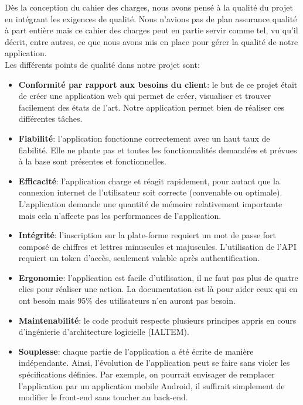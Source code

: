 \documentclass[t, 12pt, usenames,dvipsnames]{article}
\begin{document}
        \noindent Dès la conception du cahier des charges, nous avons pensé à la qualité du projet en intégrant les exigences de qualité. Nous n'avions pas de plan assurance qualité à part entière mais ce cahier des charges peut en partie servir comme tel, vu qu'il décrit, entre autres, ce que nous avons mis en place pour gérer la qualité de notre application.\\
        Les différents points de qualité dans notre projet sont:
        \begin{itemize}
            \item \textbf{Conformité par rapport aux besoins du client}: le but de ce projet était de créer une application web qui permet de créer, visualiser et trouver facilement des états de l'art. Notre application permet bien de réaliser ces différentes tâches.
            
            \item \textbf{Fiabilité}: l'application fonctionne correctement avec un haut taux de fiabilité. Elle ne plante pas et toutes les fonctionnalités demandées et prévues à la base sont présentes et fonctionnelles.
            
            \item \textbf{Efficacité}: l'application charge et réagit rapidement, pour autant que la connexion internet de l'utilisateur soit correcte (convenable ou optimale). L'application demande une quantité de mémoire relativement importante mais cela n'affecte pas les performances de l'application.
            
            \item \textbf{Intégrité}: l'inscription sur la plate-forme requiert un mot de passe fort composé de chiffres et lettres minuscules et majuscules. L'utilisation de l'API requiert un token d'accès, seulement valable après authentification.
            
            \item \textbf{Ergonomie}: l'application est facile d'utilisation, il ne faut pas plus de quatre clics pour réaliser une action. La documentation est là pour aider ceux qui en ont besoin mais 95\% des utilisateurs n'en auront pas besoin.
            
            \item \textbf{Maintenabilité}: le code produit respecte plusieurs principes appris en cours d'ingénierie d'architecture logicielle (IALTEM).
            
            \item \textbf{Souplesse}: chaque partie de l'application a été écrite de manière indépendante. Ainsi, l'évolution de l'application peut se faire sans violer les spécifications définies. Par exemple, on pourrait envisager de remplacer l'application par un application mobile Android, il suffirait simplement de modifier le front-end sans toucher au back-end.


\end{itemize}
\end{document}
